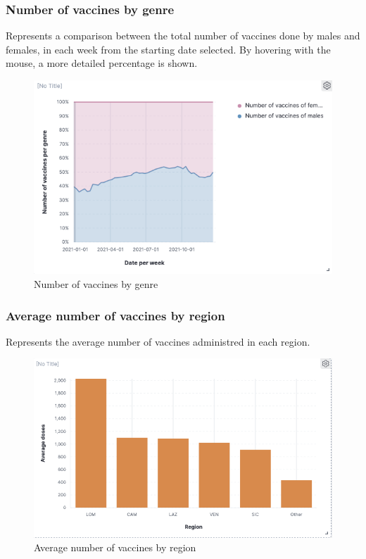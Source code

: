 \documentclass[12pt, a4paper]{article}
\begin{document}
\subsubsection{Number of vaccines by genre}
Represents a comparison between the total number of vaccines done by males and females,
in each week from the starting date selected. By hovering with the mouse, a more 
detailed percentage is shown.
\begin{figure}[H]
  \centering
  \includegraphics[width=.8\linewidth]{img (9).png}
\caption*{Number of vaccines by genre}
\end{figure}

\subsubsection{Average number of vaccines by region}
Represents the average number of vaccines administred in each region.
\begin{figure}[H]
  \centering
  \includegraphics[width=.8\linewidth]{img (10).png}
\caption*{Average number of vaccines by region}
\end{figure}
\end{document}
